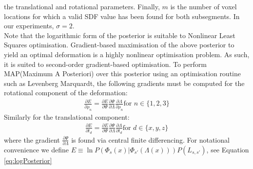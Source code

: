the translational and rotational parameters. Finally, $m$ is the number of voxel locations for which a valid SDF value has been found for both subsegments. In our experiments, $\sigma = 2$.\\
Note that the logarithmic form of the posterior is suitable to Nonlinear Least Squares optimisation. Gradient-based maximisation of the above posterior to yield an optimal deformation is a highly nonlinear optimisation problem. As such, it is suited to second-order gradient-based optimisation. To perform MAP(Maximum A Posteriori) over this posterior using 
an optimisation routine such as Levenberg Marquardt, the following gradients must be computed for the rotational component of the 
deformation:
\begin{equation}
\begin{split}
\frac{\partial E}{\partial \rho_{n}} = \frac{\partial E}{\partial \Psi} \frac{\partial \Psi}{\partial \Lambda} \frac{\partial \Lambda}{\partial \rho_{n}} \text{for } n \in \{1,2,3\}
\end{split}
\end{equation}
Similarly for the translational component:
\begin{equation}
\begin{split}
\frac{\partial E}{\partial t_{d}} = \frac{\partial E}{\partial \Psi} \frac{\partial \Psi}{\partial \Lambda} \frac{\partial \Lambda}{\partial t_{d}} \text{for } d \in  \{x,y,z\}
\end{split}
\end{equation}
where the gradient $\frac{\partial \Psi}{\partial \Lambda}$ is found via central finite differencing.
For notational convenience we define $E \equiv \ln P(\Phi_{s}(x) | \Phi_{s'}(\Lambda(x)))P(L_{s, s'})$, see Equation \ref{eq:logPosterior}


